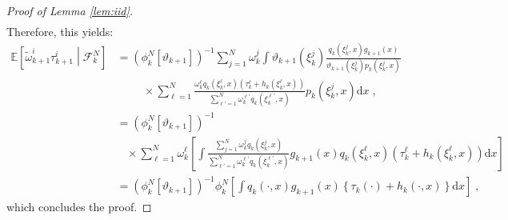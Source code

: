 \documentclass[12pt]{article}
\newcommand{\rmd}{\mathrm{d}}
\newcommand{\eqsp}{\;}
\newcommand{\1}{\mathrm{1}}
\newcommand{\qk}{q_{k}}
\begin{document}
\begin{proof}[Proof of Lemma \ref{lem:iid}]
\begin{align*}
\end{align*}
Therefore, this yields:
\begin{align*}
\mathbb{E}\left[\tilde{\omega}^i_{k+1}\tau^{i}_{k+1}\middle| \mathcal{F}_k^{N}\right]&= \left(\phi^N_{k}[\vartheta_{k+1}]\right)^{-1} \sum_{j=1}^N\omega_k^j \int \vartheta_{k+1}(\xi^{j}_{k})\frac{\qk(\xi_{k}^{j},x) g_{k+1}(x)}{\vartheta_{k+1}(\xi^{j}_{k}) p_{k}(\xi_{k}^{j},x)}\\
&\hspace{1cm}\times \sum_{\ell=1}^N\frac{\omega_k^{\ell} \qk (\xi_{k}^{\ell},x)\left(\tau^{\ell}_k + h_{k}(\xi_{k}^{\ell},x)\right)}{\sum_{\ell'=1}^N\omega_k^{\ell'}\qk(\xi_{k}^{\ell'},x)}p_{k}(\xi_{k}^{j},x)\rmd x\eqsp,\\
&= \left(\phi^N_{k}[\vartheta_{k+1}]\right)^{-1}\\
&~~~~\times\sum_{\ell=1}^N \omega_k^\ell\left[\int \frac{ \sum_{j=1}^N \omega_k^j\qk(\xi_k^j,x) }{ \sum_{\ell'=1}^N\omega_k^{\ell'}\qk(\xi_{k}^{\ell'},x) } g_{k+1}(x)\qk (\xi_{k}^{\ell},x)\left(\tau^{\ell}_k + h_{k}(\xi_{k}^{\ell},x)\right) \rmd x \right]\\ 
& =\left(\phi^N_{k}[\vartheta_{k+1}]\right)^{-1}\phi^N_{k}\left[\int \qk(\cdot,x)g_{k+1}(x)\left\{\tau_k(\cdot) + h_{k}(\cdot,x)\right\}\rmd x\right]\eqsp,
\end{align*}
which concludes the proof.
\end{proof}
\end{document}
